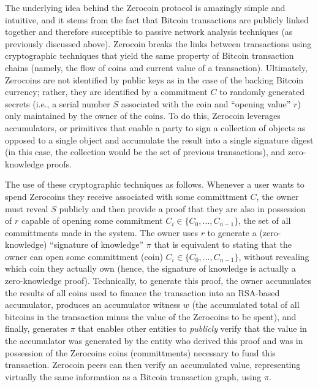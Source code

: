 The underlying idea behind the Zerocoin protocol is amazingly simple and intuitive, and it stems from the fact that Bitcoin transactions are publicly linked together and therefore susceptible to passive network analysis techniques (as previously discussed above). Zerocoin breaks the links between transactions using cryptographic techniques that yield the same property of Bitcoin transaction chains (namely, the flow of coins and current value of a transaction). Ultimately, Zerocoins are not identified by public keys as in the case of the backing Bitcoin currency; rather, they are identified by a commitment $C$ to randomly generated secrets (i.e., a serial number $S$ associated with the coin and ``opening value'' $r$) only maintained by the owner of the coins. To do this, Zerocoin leverages accumulators, or primitives that enable a party to sign a collection of objects as opposed to a single object and accumulate the result into a single signature digest (in this case, the collection would be the set of previous transactions), and zero-knowledge proofs. 

The use of these cryptographic techniques as follows. Whenever a user wants to spend Zerocoins they receive associated with some committment $C$, the owner must reveal $S$ publicly and then provide a proof that they are also in possession of $r$ capable of opening some commitment $C_i \in \{C_0,\dots,C_{n-1}\}$, the set of all committments made in the system. The owner uses $r$ to generate a (zero-knowledge) ``signature of knowledge'' $\pi$ that is equivalent to stating that the owner can open some committment (coin) $C_i \in \{C_0,\dots,C_{n-1}\}$, without revealing which coin they actually own (hence, the signature of knowledge is actually a zero-knowledge proof). Technically, to generate this proof, the owner accumulates the results of all coins used to finance the transaction into an RSA-based accumulator, produces an accumulator witness $w$ (the accumulated total of all bitcoins in the transaction minus the value of the Zerocoins to be spent), and finally, generates $\pi$ that enables other entities to \emph{publicly} verify that the value in the accumulator was generated by the entity who derived this proof and was in possession of the Zerocoins coins (committments) necessary to fund this transaction. Zerocoin peers can then verify an accumulated value, representing virtually the same information as a Bitcoin transaction graph, using $\pi$.

